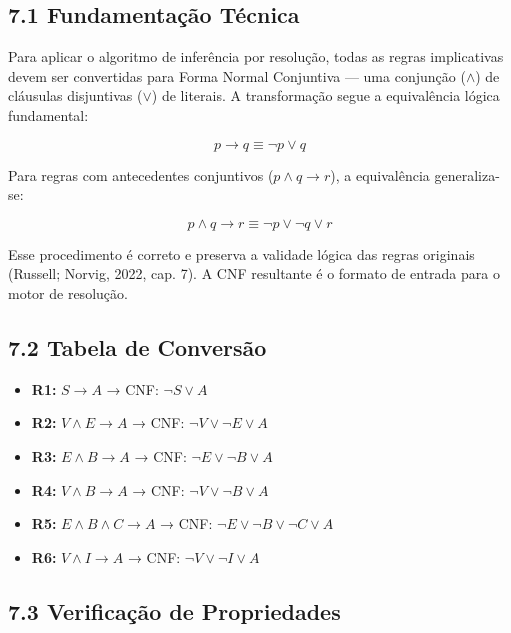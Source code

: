 \documentclass[11pt]{article}
\providecommand{\tightlist}{%
      \setlength{\itemsep}{0pt}\setlength{\parskip}{0pt}}
\begin{document}
\subsection{7.1 Fundamentação
Técnica}\label{fundamentauxe7uxe3o-tuxe9cnica}

Para aplicar o algoritmo de inferência por resolução, todas as regras
implicativas devem ser convertidas para Forma Normal Conjuntiva --- uma
conjunção (\(\land\)) de cláusulas disjuntivas (\(\lor\)) de literais. A
transformação segue a equivalência lógica fundamental:

\[p \rightarrow q \equiv \neg p \lor q\]

Para regras com antecedentes conjuntivos (\(p \land q \rightarrow r\)),
a equivalência generaliza-se:

\[p \land q \rightarrow r \equiv \neg p \lor \neg q \lor r\]

Esse procedimento é correto e preserva a validade lógica das regras
originais (Russell; Norvig, 2022, cap. 7). A CNF resultante é o formato
de entrada para o motor de resolução.

\subsection{7.2 Tabela de Conversão}\label{tabela-de-conversuxe3o}

\begin{itemize}
\tightlist
\item
  \textbf{R1:} \(S \rightarrow A\) → CNF: \(\neg S \lor A\)
\item
  \textbf{R2:} \(V \land E \rightarrow A\) → CNF:
  \(\neg V \lor \neg E \lor A\)
\item
  \textbf{R3:} \(E \land B \rightarrow A\) → CNF:
  \(\neg E \lor \neg B \lor A\)
\item
  \textbf{R4:} \(V \land B \rightarrow A\) → CNF:
  \(\neg V \lor \neg B \lor A\)
\item
  \textbf{R5:} \(E \land B \land C \rightarrow A\) → CNF:
  \(\neg E \lor \neg B \lor \neg C \lor A\)
\item
  \textbf{R6:} \(V \land I \rightarrow A\) → CNF:
  \(\neg V \lor \neg I \lor A\)
\end{itemize}

\subsection{7.3 Verificação de
Propriedades}\label{verificauxe7uxe3o-de-propriedades}
\end{document}

